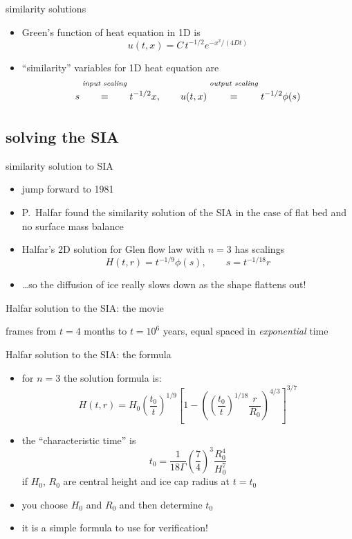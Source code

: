 \documentclass[titlepage,letterpaper,final,11pt]{scrartcl}
\begin{document}
similarity solutions

\begin{itemize}
\item Green's function of heat equation in 1D is
	$$u(t,x) = C\, t^{-1/2} e^{-x^2/(4Dt)}$$
\item ``similarity'' variables for 1D heat equation are
	$$s \stackrel{\text{\emph{input scaling}}}{\phantom{\Big|}=\phantom{\Big|}} t^{-1/2} x, \qquad u(t,x) \stackrel{\text{\emph{output scaling}}}{\phantom{\Big|}=\phantom{\Big|}} t^{-1/2} \phi(s)$$
\end{itemize}




\subsection{solving the SIA}

similarity solution to SIA

\begin{itemize}
\item jump forward to 1981
\item P.~Halfar found the similarity solution of the SIA in the case of flat bed and no surface mass balance \nocite{Halfar81,Halfar83}
\item Halfar's 2D solution for Glen flow law with $n=3$ has scalings
   $$H(t,r)=t^{-1/9} \phi(s), \qquad s = t^{-1/18} r$$
\item \dots so the diffusion of ice really slows down as the shape flattens out!
\end{itemize}

Halfar solution to the SIA: the movie


frames from $t=4$ months to $t = 10^6$ years, equal spaced in \emph{exponential} time

Halfar solution to the SIA: the formula

\begin{itemize}
\item for $n=3$ the solution formula is:
  $$H(t,r) = H_0 \left(\frac{t_0}{t}\right)^{1/9} \left[1 - \left(\left(\frac{t_0}{t}\right)^{1/18} \frac{r}{R_0}\right)^{4/3}\right]^{3/7}$$
\item the ``characteristic time'' is
  $$t_0 = \frac{1}{18 \Gamma} \left(\frac{7}{4}\right)^3 \frac{R_0^4}{H_0^{7}}$$
if $H_0$, $R_0$ are central height and ice cap radius at $t=t_0$
\item you choose $H_0$ and $R_0$ and then determine $t_0$
\item it is a simple formula to use for verification!
\end{itemize}
\end{document}
